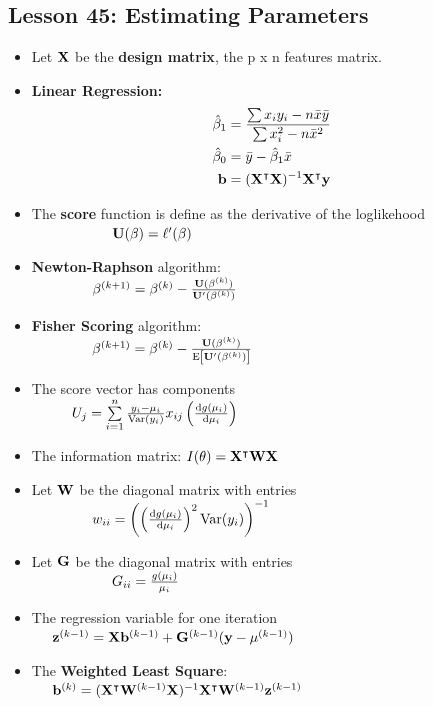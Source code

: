 \documentclass[10pt, french]{article}
\begin{document}
\begin{multicols*}{3}
\section*{Lesson 45: Estimating Parameters}
\begin{itemize}[align=left,leftmargin=*]
  \item Let $\mathbf{X}$ be the \textbf{design matrix}, the p x n features matrix.
  \item \textbf{Linear Regression:} \\
  \begin{align*}
    \hat{\beta}_1 &= \frac{\sum x_iy_i - n\bar{x}\bar{y}}{\sum x_i^2 - n\bar{x}^2} \\
    \hat{\beta}_0 &= \bar{y} - \hat{\beta}_1 \bar{x} \\
    \mathbf{b} &= (\mathbf{X}^\intercal\mathbf{X})^{-1}\mathbf{X}^\intercal \mathbf{y}
  \end{align*}
  \item The \textbf{score} function is define as the derivative of the loglikehood \\
  $\hspace*{2cm} \mathbf{U}(\beta) = \ell'(\beta)$
  \item \textbf{Newton-Raphson} algorithm: \\
  $\hspace*{1.5cm} \beta^{(k+1)} =\beta^{(k)} - \frac{\mathbf{U}(\beta^{(k)})}{\mathbf{U}'(\beta^{(k)})}$
  \item \textbf{Fisher Scoring} algorithm:\\
  $\hspace*{1.5cm} \beta^{(k+1)} =\beta^{(k)} - \frac{\mathbf{U}(\beta^{(k)})}{\mathrm{E} {\left[ \mathbf{U}'(\beta^{(k)}) \right]}}$
  \item The score vector has components \\
  $\hspace*{1cm} U_j =\sum\limits_{i=1}^n \frac{y_i - \mu_i}{\mathrm{Var} {\left( y_i \right)}}x_{ij}\left( \frac{\mathop{}\!\mathrm{d} g(\mu_i)}{\mathop{}\!\mathrm{d} \mu_i}\right)$
  \item The information matrix: $I(\theta) = \mathbf{X}^\intercal\mathbf{W}\mathbf{X}$
  \item Let $\mathbf{W}$ be the diagonal matrix with entries \\
  $\hspace*{1.5cm}w_{ii} =\left( \left(\frac{\mathop{}\!\mathrm{d} g(\mu_i)}{\mathop{}\!\mathrm{d}\mu_i}\right)^2 \mathrm{Var} {\left( y_i \right)}\right)^{-1}$
  \item Let $\mathbf{G}$ be the diagonal matrix with entries \\
  $\hspace*{2cm}G_{ii} =\frac{g(\mu_i)}{\mu_i}$
  \item The regression variable for one iteration \\
  $\hspace*{0.5cm}\mathbf{z}^{(k-1)}= \mathbf{X}\mathbf{b}^{(k-1)} + \mathbf{G}^{(k-1)}(\mathbf{y} - \mathbf{\mu}^{(k-1)})$
  \item The \textbf{Weighted Least Square}: \\
  $\hspace*{0.5cm} \mathbf{b}^{(k)} = (\mathbf{X}^\intercal\mathbf{W}^{(k-1)}\mathbf{X})^{-1}\mathbf{X}^\intercal\mathbf{W}^{(k-1)}\mathbf{z}^{(k-1)}$
\end{itemize}


\end{multicols*}
\end{document}
